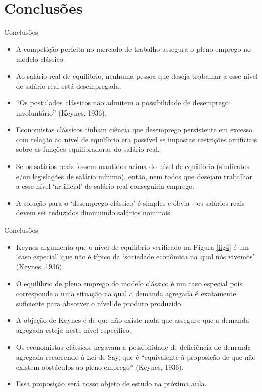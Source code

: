 \documentclass[10pt]{beamer}
\begin{document}
\section{Conclusões}
\begin{frame}{Conclusões}
    \begin{itemize}
        \item A competição perfeita no mercado de trabalho assegura o pleno emprego no modelo clássico.\medskip

        \item Ao salário real de equilíbrio, nenhuma pessoa que deseja trabalhar a esse nível de salário real está desempregada.\medskip

        \item ``Os postulados clássicos não admitem a possibilidade de desemprego involuntário'' (Keynes, 1936).\medskip

        \item Economistas clássicos tinham ciência que desemprego persistente em excesso com relação ao nível de equilíbrio era possível se impostas restrições artificiais sobre as funções equilibradoras do salário real.\medskip

        \item Se os salários reais fossem mantidos acima do nível de equilíbrio (sindicatos e/ou legislações de salário mínimo), então, nem todos que desejam trabalhar a esse nível `artificial' de salário real conseguiria emprego.\medskip

        \item A solução para o `desemprego clássico' é simples e óbvia - os salários reais devem ser reduzidos diminuindo salários nominais.
    \end{itemize}
\end{frame}

\begin{frame}{Conclusões}
    \begin{itemize}
        \item Keynes argumenta que o nível de equilíbrio verificado na Figura \ref{fig4} é um `caso especial' que não é típico da `sociedade econômica na qual nós vivemos' (Keynes, 1936).\bigskip

        \item O equilíbrio de pleno emprego do modelo clássico é um caso especial pois corresponde a uma situação na qual a demanda agregada é exatamente suficiente para absorver o nível de produto produzido.\bigskip

        \item A objeção de Keynes é de que não existe nada que assegure que a demanda agregada esteja neste nível específico.\bigskip

        \item Os economistas clássicos negavam a possibilidade de deficiência de demanda agregada recorrendo à Lei de Say, que é ``equivalente à proposição de que não existem obstáculos ao pleno emprego'' (Keynes, 1936).\bigskip

        \item Essa proposição será nosso objeto de estudo na próxima aula.
    \end{itemize}
\end{frame}
\end{document}
